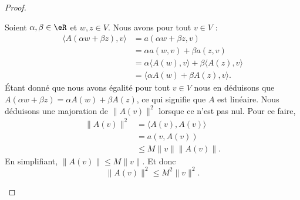 \begin{proof}
\begin{subproof}
		Soient \( \alpha,\beta\in \eR\) et \( w,z\in V\). Nous avons pour tout \( v\in V\) :
		\begin{subequations}
			\begin{align}
				\langle  A(\alpha w+\beta z), v\rangle & =a(\alpha w+\beta z,v)                                     \\
				                                       & =\alpha a(w,v)+\beta a(z,v)                                \\
				                                       & =\alpha\langle A(w), v\rangle +\beta\langle A(z), v\rangle \\
				                                       & =\langle \alpha A(w)+\beta A(z), v\rangle .
			\end{align}
		\end{subequations}
		Étant donné que nous avons égalité pour tout \( v\in V\) nous en déduisons que \( A(\alpha w+\beta z)=\alpha A(w)+\beta A(z)\), ce qui signifie que \( A \) est linéaire.
		Nous déduisons une majoration de \( \| A(v) \|^2\) lorsque ce n'est pas nul. Pour ce faire,
		\begin{subequations}
			\begin{align}
				\| A(v) \|^2 & =\langle A(v), A(v)\rangle \\
				             & =a(v,A(v))                 \\
				             & \leq M\| v \|\| A(v) \|.
			\end{align}
		\end{subequations}
		En simplifiant, \( \| A(v) \|\leq M\| v \|\). Et donc
		\begin{equation}        \label{EQooBQAHooAZRdAW}
			\| A(v) \|^2\leq M^2\| v \|^2.
		\end{equation}


\end{subproof}
\end{proof}
